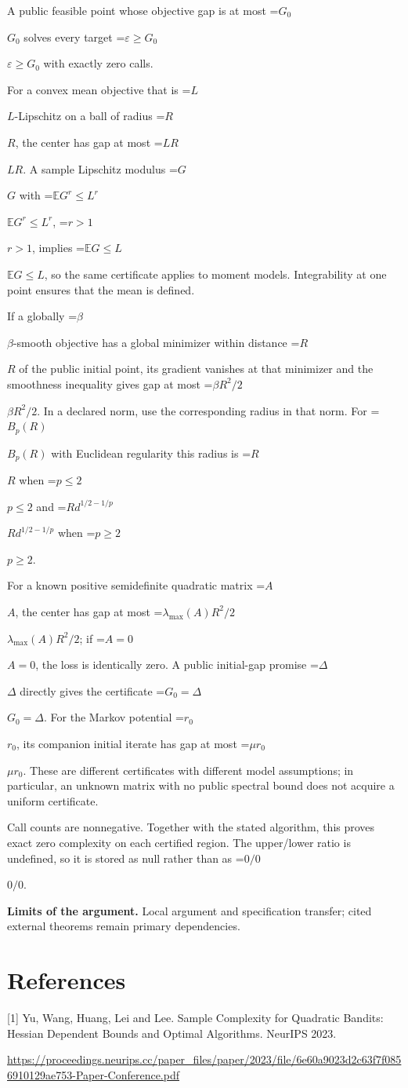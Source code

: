 \documentclass[10pt,a4paper]{article}
\newcommand{\AtlasMath}[1]{\par\begingroup\centering\setbox0=\hbox{$\displaystyle #1$}\ifdim\wd0>1.4\linewidth\typeout{ATLAS WIDE FORMULA: \the\wd0}\fi\ifdim\wd0>\linewidth\resizebox{\linewidth}{!}{\box0}\else\box0\fi\par\endgroup}
\newcommand{\AtlasInlineMath}[1]{\begingroup\setbox0=\hbox{$#1$}\ifdim\wd0>.4\linewidth\endgroup\AtlasMath{#1}\else\endgroup$#1$\fi}
\begin{document}
A public feasible point whose objective gap is at most \AtlasInlineMath{G_0} solves every target \AtlasInlineMath{\varepsilon\ge G_0} with exactly zero calls.

For a convex mean objective that is \AtlasInlineMath{L}-Lipschitz on a ball of radius \AtlasInlineMath{R}, the center has gap at most \AtlasInlineMath{LR}. A sample Lipschitz modulus \AtlasInlineMath{G} with \AtlasInlineMath{\mathbb E G^r\le L^r}, \AtlasInlineMath{r>1}, implies \AtlasInlineMath{\mathbb E G\le L}, so the same certificate applies to moment models. Integrability at one point ensures that the mean is defined.

If a globally \AtlasInlineMath{\beta}-smooth objective has a global minimizer within distance \AtlasInlineMath{R} of the public initial point, its gradient vanishes at that minimizer and the smoothness inequality gives gap at most \AtlasInlineMath{\beta R^2/2}. In a declared norm, use the corresponding radius in that norm. For \AtlasInlineMath{B_p(R)} with Euclidean regularity this radius is \AtlasInlineMath{R} when \AtlasInlineMath{p\le2} and \AtlasInlineMath{R d^{1/2-1/p}} when \AtlasInlineMath{p\ge2}.

For a known positive semidefinite quadratic matrix \AtlasInlineMath{A}, the center has gap at most \AtlasInlineMath{\lambda_{\max}(A)R^2/2}; if \AtlasInlineMath{A=0}, the loss is identically zero. A public initial-gap promise \AtlasInlineMath{\Delta} directly gives the certificate \AtlasInlineMath{G_0=\Delta}. For the Markov potential \AtlasInlineMath{r_0}, its companion initial iterate has gap at most \AtlasInlineMath{\mu r_0}. These are different certificates with different model assumptions; in particular, an unknown matrix with no public spectral bound does not acquire a uniform certificate.

Call counts are nonnegative. Together with the stated algorithm, this proves exact zero complexity on each certified region. The upper/lower ratio is undefined, so it is stored as null rather than as \AtlasInlineMath{0/0}.

\textbf{Limits of the argument.} Local argument and specification transfer; cited external theorems remain primary dependencies.

\section{References}
[1] Yu, Wang, Huang, Lei and Lee. Sample Complexity for Quadratic Bandits: Hessian Dependent Bounds and Optimal Algorithms. NeurIPS 2023.

\url{https://proceedings.neurips.cc/paper_files/paper/2023/file/6e60a9023d2c63f7f0856910129ae753-Paper-Conference.pdf}
\end{document}
